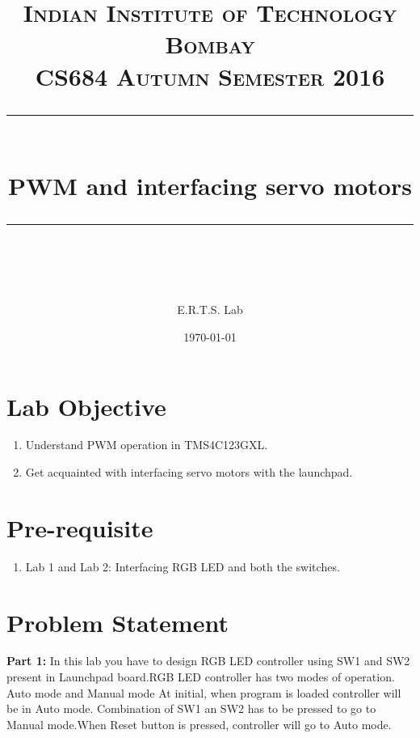 \documentclass{article} %
\title{
\normalfont \normalsize 
\textsc{Indian Institute of Technology Bombay \\ 
CS684 Autumn Semester 2016} \\
[10pt] 
\rule{\linewidth}{0.5pt} \\[6pt] 
\huge PWM and interfacing servo motors \\
\rule{\linewidth}{2pt}  \\[10pt]
}
\author{E.R.T.S. Lab}
\date{\normalsize \today}
\begin{document}
\maketitle
\noindent

\section{Lab Objective}
\begin{enumerate}
\item 
Understand PWM operation in TMS4C123GXL.
\item
Get acquainted with interfacing servo motors with the launchpad.
\end{enumerate}

\section{Pre-requisite}
\begin{enumerate}
\item Lab 1 and Lab 2: Interfacing RGB LED and both the switches.
\end{enumerate}
\section {Problem Statement}

\textbf{Part 1:} 
In this lab you have to design RGB LED controller using SW1 and SW2 present in Launchpad
board.RGB LED controller has two modes of operation. Auto mode and Manual mode
At initial, when program is loaded controller will be in Auto mode. Combination of SW1 an SW2
has to be pressed to go to Manual mode.When Reset button is pressed, controller will go to Auto mode.
\end{document}
